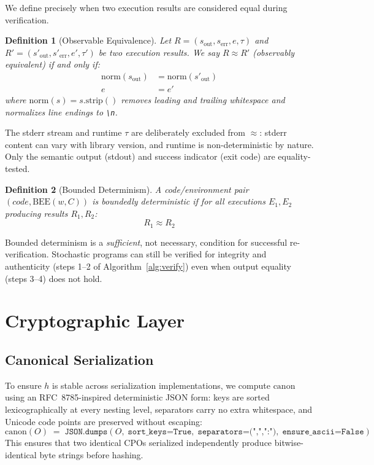\documentclass[11pt]{article}
\newtheorem{definition}{Definition}
\begin{document}
We define precisely when two execution results are considered equal during
verification.

\begin{definition}[Observable Equivalence]
\label{def:equiv}
Let $R = (s_{\mathrm{out}}, s_{\mathrm{err}}, e, \tau)$ and
$R' = (s'_{\mathrm{out}}, s'_{\mathrm{err}}, e', \tau')$ be two execution
results.  We say $R \approx R'$ (\emph{observably equivalent}) if and only
if:
\begin{align}
  \mathrm{norm}(s_{\mathrm{out}}) &= \mathrm{norm}(s'_{\mathrm{out}}) \label{eq:stdout} \\
  e &= e' \label{eq:exit}
\end{align}
where $\mathrm{norm}(s) = s.\mathrm{strip}()$ removes leading and trailing
whitespace and normalizes line endings to \texttt{\textbackslash n}.
\end{definition}

The stderr stream and runtime $\tau$ are deliberately excluded from
$\approx$: stderr content can vary with library version, and runtime is
non-deterministic by nature.  Only the semantic output (stdout) and success
indicator (exit code) are equality-tested.

\begin{definition}[Bounded Determinism]
\label{def:det}
A code/environment pair $(\textit{code}, \mathrm{BEE}(w, C))$ is
\emph{boundedly deterministic} if for all executions $E_1, E_2$ producing
results $R_1, R_2$:
\[
  R_1 \approx R_2
\]
\end{definition}

Bounded determinism is a \emph{sufficient}, not necessary, condition for
successful re-verification.  Stochastic programs can still be verified for
integrity and authenticity (steps 1--2 of Algorithm~\ref{alg:verify}) even
when output equality (steps 3--4) does not hold.

\section{Cryptographic Layer}
\label{sec:crypto}

\subsection{Canonical Serialization}
\label{sec:canon}

To ensure $h$ is stable across serialization implementations, we compute
$\mathrm{canon}$ using an RFC~8785-inspired deterministic JSON form: keys
are sorted lexicographically at every nesting level, separators carry no
extra whitespace, and Unicode code points are preserved without escaping:
\[
  \mathrm{canon}(O) \;=\;
    \texttt{JSON.dumps}\!\left(O,\;
    \texttt{sort\_keys=True},\;
    \texttt{separators=(",",":")},\;
    \texttt{ensure\_ascii=False}\right)
\]
This ensures that two identical CPOs serialized independently produce
bitwise-identical byte strings before hashing.
\end{document}
